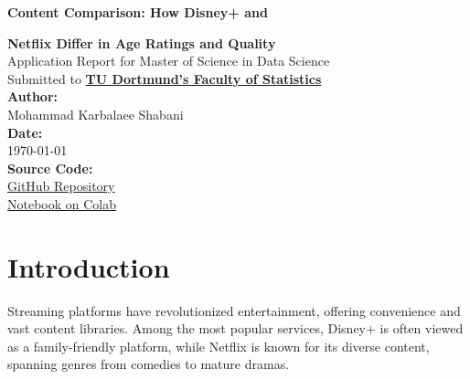 \documentclass[a4paper, 12pt]{article}
\begin{document}
\begin{titlepage}
    \centering 
    
    \vspace*{2cm}
    
{\LARGE \textbf{\textcolor{grun}{Content Comparison:} How Disney+ and}} 

\vspace{0.5cm} %

{\LARGE \textbf{Netflix Differ in \textcolor{grun}{Age Ratings} and \textcolor{grun}{Quality}}} \\[3cm]

    {\Large Application Report for Master of Science in Data Science}\\[1cm]
      {\large Submitted to \textbf{\href{https://statistik.tu-dortmund.de/en/}{TU Dortmund's Faculty of Statistics}}}\\[0.5cm]

    
    \vspace{3cm}
    \textcolor{grun}{\textbf{Author:}}\\
    Mohammad Karbalaee Shabani \\[0.5cm]
    
    \textcolor{grun}{\textbf{Date:}}\\
    \today \\[2cm]

    \textbf{Source Code:}\\
    \vspace{0.15cm}
    \href{https://github.com/mohammadkarbalaee/Movies-on-Netflix-Prime-Video-Hulu-and-Disney}{GitHub Repository} \\[0.1cm]
    \href{https://colab.research.google.com/drive/1ndNb2C8GhkVdQ8_PwA0n4-C5B5k3smSz?usp=sharing}{Notebook on Colab}
    
\end{titlepage}

\tableofcontents

\newpage

\setcounter{page}{1}
\section{Introduction}

Streaming platforms have revolutionized entertainment, offering convenience and vast content libraries. Among the most popular services, Disney+ is often viewed as a family-friendly platform, while Netflix is known for its diverse content, spanning genres from comedies to mature dramas.
\end{document}
